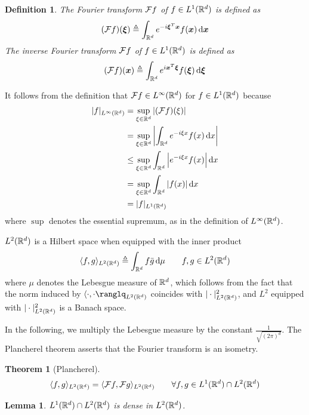 \documentclass{article}
\newtheorem{definition}{Definition}
\newtheorem{lemma}{Lemma}
\newtheorem{theorem}{Theorem}
\begin{document}
\begin{definition}
The Fourier transform ${\mathcal F} f$ of $f \in L^1 ({\mathbb R}^d)$ is defined as
\[
(\calf f) (\bmxi) \triangleq \int_{\bbr^d} e^{-i \bmxi^T \bmx} f(\bmx) \dif \bmx
\]
The inverse Fourier transform ${\mathcal F} f$ of $f \in L^1 ({\mathbb R}^d)$ is defined as
\[
(\calf f) (\bmx) \triangleq \int_{\bbr^d} e^{i \bmx^T \bmxi} f(\bmxi) \dif \bmxi
\]
\end{definition}

It follows from the definition that ${\mathcal F} f \in L^\infty ({\mathbb R}^d)$ for $f \in L^1 ({\mathbb R}^d)$ because
\begin{align*}
|f|_{L^\infty (\bbr^d)}
& = \sup_{\xi \in \bbr^d} |(\calf f) (\xi)| \\
& = \sup_{\xi \in \bbr^d} \left|\int_{\bbr^d} e^{-i \xi x} f(x) \dif x \right| \\
& \leq \sup_{\xi \in \bbr^d} \int_{\bbr^d} \left|e^{-i \xi x} f(x) \right| \dif x \\
& = \sup_{\xi \in \bbr^d} \int_{\bbr^d} |f(x)| \dif x \\
& = |f|_{L^1 (\bbr^d)}
\end{align*}
where $\sup$ denotes the essential supremum, as in the definition of $L^\infty ({\mathbb R}^d)$.

$L^2 ({\mathbb R}^d)$ is a Hilbert space when equipped with the inner product
\[
\langle f, g\rangle_{L^2 (\bbr^d)} \triangleq \int_{\bbr^d} f \bar{g} \dif \mu \qquad f, g \in L^2 (\bbr^d)
\]
where $\mu$ denotes the Lebesgue measure of ${\mathbb R}^d$, which follows from the fact that the norm induced by $\langle \cdot, \cdot\ranglq_{L^2 (\bbr^d)}$ coincides with $|\cdot|_{L^2 ({\mathbb R}^d)}^2$, and $L^2$ equipped with $|\cdot|_{L^2 ({\mathbb R}^d)}^2$ is a Banach space.

In the following, we multiply the Lebesgue measure by the constant $\frac1{\sqrt{(2 \pi)^d}}$.
The Plancherel theorem asserts that the Fourier transform is an isometry.
\begin{theorem}[Plancherel]
\[
\langle f, g\rangle_{L^2 ({\mathbb R}^d)} = \langle {\mathcal F} f, {\mathcal F} g\rangle_{L^2 ({\mathbb R}^d)} \qquad \forall f, g \in L^1 ({\mathbb R}^d) \cap L^2 ({\mathbb R}^d)
\]
\end{theorem}

\begin{lemma}
$L^1 ({\mathbb R}^d) \cap L^2 ({\mathbb R}^d)$ is dense in $L^2 ({\mathbb R}^d)$.
\end{lemma}
\end{document}
